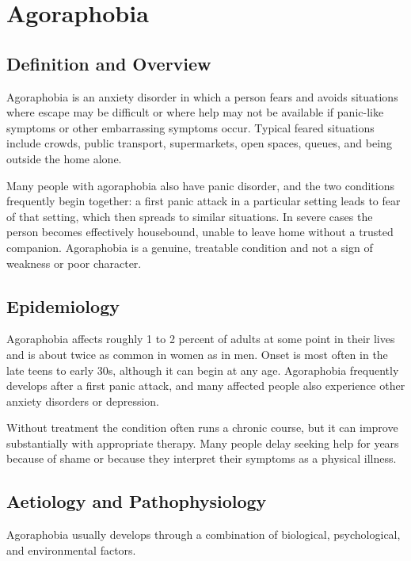 \chapter{Agoraphobia}

\section*{Definition and Overview}
Agoraphobia is an anxiety disorder in which a person fears and avoids situations where escape may be difficult or where help may not be available if panic-like symptoms or other embarrassing symptoms occur. Typical feared situations include crowds, public transport, supermarkets, open spaces, queues, and being outside the home alone.

Many people with agoraphobia also have panic disorder, and the two conditions frequently begin together: a first panic attack in a particular setting leads to fear of that setting, which then spreads to similar situations. In severe cases the person becomes effectively housebound, unable to leave home without a trusted companion. Agoraphobia is a genuine, treatable condition and not a sign of weakness or poor character.

\section*{Epidemiology}
Agoraphobia affects roughly 1 to 2 percent of adults at some point in their lives and is about twice as common in women as in men. Onset is most often in the late teens to early 30s, although it can begin at any age. Agoraphobia frequently develops after a first panic attack, and many affected people also experience other anxiety disorders or depression.

Without treatment the condition often runs a chronic course, but it can improve substantially with appropriate therapy. Many people delay seeking help for years because of shame or because they interpret their symptoms as a physical illness.

\section*{Aetiology and Pathophysiology}
Agoraphobia usually develops through a combination of biological, psychological, and environmental factors.

